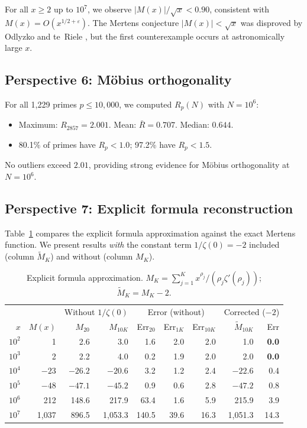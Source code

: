 \documentclass[11pt,a4paper]{article}
\theoremstyle{definition}
\begin{document}
For all $x \geq 2$ up to $10^7$, we observe $|M(x)|/\sqrt{x} < 0.90$, consistent with $M(x) = O(x^{1/2+\varepsilon})$. The Mertens conjecture $|M(x)| < \sqrt{x}$ was disproved by Odlyzko and te~Riele \cite{OdlyzkoTeRiele1985}, but the first counterexample occurs at astronomically large $x$.

\subsection{Perspective 6: M\"obius orthogonality}

For all 1{,}229 primes $p \leq 10{,}000$, we computed $R_p(N)$ with $N = 10^6$:
\begin{itemize}
  \item Maximum: $R_{2857} = 2.001$. Mean: $\bar{R} = 0.707$. Median: $0.644$.
  \item 80.1\% of primes have $R_p < 1.0$; 97.2\% have $R_p < 1.5$.
\end{itemize}
No outliers exceed $2.01$, providing strong evidence for M\"obius orthogonality at $N = 10^6$.

\subsection{Perspective 7: Explicit formula reconstruction}

Table~\ref{tab:explicit} compares the explicit formula approximation against the exact Mertens function. We present results \emph{with} the constant term $1/\zeta(0) = -2$ included (column $\widetilde{M}_{K}$) and without (column $M_K$).

\begin{table}[H]
\centering
\caption{Explicit formula approximation. $M_K = \sum_{j=1}^{K} x^{\rho_j}/(\rho_j\zeta'(\rho_j))$; $\widetilde{M}_K = M_K - 2$.}
\label{tab:explicit}
\begin{tabular}{@{}rr|rr|rrr|rr@{}}
\toprule
 & & \multicolumn{2}{c|}{Without $1/\zeta(0)$} & \multicolumn{3}{c|}{Error (without)} & \multicolumn{2}{c}{Corrected ($-2$)} \\
$x$ & $M(x)$ & $M_{20}$ & $M_{10K}$ & Err$_{20}$ & Err$_{1K}$ & Err$_{10K}$ & $\widetilde{M}_{10K}$ & Err \\
\midrule
$10^2$    & 1      & 2.6    & 3.0     & 1.6  & 2.0  & 2.0   & 1.0     & \textbf{0.0} \\
$10^3$    & 2      & 2.2    & 4.0     & 0.2  & 1.9  & 2.0   & 2.0     & \textbf{0.0} \\
$10^4$    & $-23$  & $-26.2$ & $-20.6$ & 3.2  & 1.2  & 2.4   & $-22.6$ & 0.4 \\
$10^5$    & $-48$  & $-47.1$ & $-45.2$ & 0.9  & 0.6  & 2.8   & $-47.2$ & 0.8 \\
$10^6$    & 212    & 148.6  & 217.9   & 63.4 & 1.6  & 5.9   & 215.9   & 3.9 \\
$10^7$    & 1{,}037  & 896.5  & 1{,}053.3 & 140.5 & 39.6 & 16.3 & 1{,}051.3 & 14.3 \\
\bottomrule
\end{tabular}
\end{table}
\end{document}
